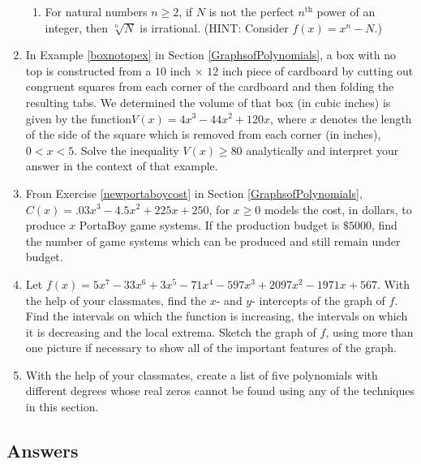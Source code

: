 \documentclass{ximera}
\begin{document}
\begin{enumerate}
\begin{enumerate}
\item  For natural numbers $n \geq 2$, if $N$ is not the perfect $n^{\text{th}}$ power of an integer, then $\sqrt[n]{N}$ is irrational. (HINT: Consider $f(x) = x^n-N$.)

\end{enumerate}

\item  In Example \ref{boxnotopex} in Section \ref{GraphsofPolynomials}, a box with no top is constructed from a $10$ inch $\times$ $12$ inch piece of cardboard by cutting out congruent squares from each corner of the cardboard and then folding the resulting tabs.  We determined the volume of that box (in cubic inches) is given by  the function$V(x) = 4x^3-44x^2+120x$, where $x$ denotes the length of the side of the square which is removed from each corner (in inches), $0 < x < 5$.  Solve the inequality $V(x) \geq 80$ analytically and interpret your answer in the context of that example.

\item  From Exercise \ref{newportaboycost} in Section \ref{GraphsofPolynomials}, $C(x) = .03x^{3} - 4.5x^{2} + 225x + 250$, for $x \geq 0$ models the cost, in dollars, to produce $x$ PortaBoy game systems. If the production budget is $\$5000$, find the number of game systems which can be produced and still remain under budget.

\item Let $f(x) = 5x^{7} - 33x^{6} + 3x^{5} - 71x^{4} - 597x^{3} + 2097x^{2} - 1971x + 567$.  With the help of your classmates, find the $x$- and $y$- intercepts of the graph of $f$.  Find the intervals on which the function is increasing, the intervals on which it is decreasing and the local extrema.  Sketch the graph of $f$, using more than one picture if necessary to show all of the important features of the graph.  

\item With the help of your classmates, create a list of five polynomials with different degrees whose real zeros cannot be found using any of the techniques in this section.

\setcounter{HW}{\value{enumi}}
\end{enumerate}
 



\newpage

\subsection{Answers}
\end{document}
